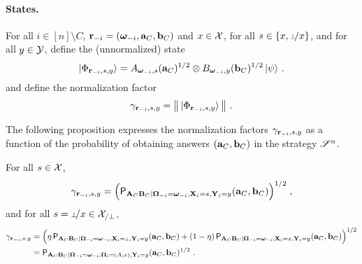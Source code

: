 \paragraph{States.}  For all $i \in [n] \setminus C$, $\mathbf{r}_{-i} = ({\boldsymbol{\omega}}_{-i},\mathbf{a}_C,\mathbf{b}_C)$ and $x \in \mathcal{X}$, for all $s \in \{x,\dummyx\}$, and for all $y \in \mathcal{Y}$, define the (unnormalized) state
\begin{equation}\label{eq:def-state-y}
	{|\Phi_{\mathbf{r}_{-i},s,y}\rangle} = A_{{\boldsymbol{\omega}}_{-i},s}(\mathbf{a}_C)^{1/2} \otimes B_{{\boldsymbol{\omega}}_{-i},y}(\mathbf{b}_C)^{1/2} \, {|\psi\rangle}~.
\end{equation}
and define the normalization factor
\begin{equation}\label{eq:def-gamma}
	\gamma_{\mathbf{r}_{-i},s,y} = \big \| \, {|\Phi_{\mathbf{r}_{-i},s,y}\rangle} \, \big \|~.
\end{equation}

The following proposition expresses the normalization factors $\gamma_{\mathbf{r}_{-i},s,y}$ as a function of the probability of obtaining answers $(\mathbf{a}_C,\mathbf{b}_C)$ in the strategy $\mathscr{S}^n$. 

\begin{proposition}
\label{prop:gamma}
For all $s \in \mathcal{X}$, 
\begin{equation}\label{eq:gamma-def-1}
	\gamma_{\mathbf{r}_{-i},s,y} = \Big( \mathsf{P}_{\mathbf{A}_C \mathbf{B}_C | {\boldsymbol{\Omega}}_{-i} = {\boldsymbol{\omega}}_{-i}, \mathbf{X}_i = s, \mathbf{Y}_i = y}(\mathbf{a}_C,\mathbf{b}_C) \Big)^{1/2}\;,
\end{equation}
and for all $s = \dummyx \in \X_{/\perp}$,
\begin{align}\label{eq:gamma-def-2}
	\gamma_{\br_\mi,s,y} &= \Big( \eta \, \P_{\bA_C \bB_C | \bOmega_\mi = \bomega_\mi, \bX_i = \dummy, \bY_i = y}(\ba_C,\bb_C) + (1 - \eta) \, \P_{\bA_C \bB_C | \bOmega_\mi = \bomega_\mi, \bX_i = x, \bY_i = y}(\ba_C,\bb_C)\Big)^{1/2} \\
	&= \P_{\bA_C \bB_C | \bOmega_\mi = \bomega_\mi, \bOmega_i = (A,x), \bY_i = y}(\ba_C,\bb_C)^{1/2}~.\label{eq:gamma-def-3}
\end{align}
\end{proposition}

